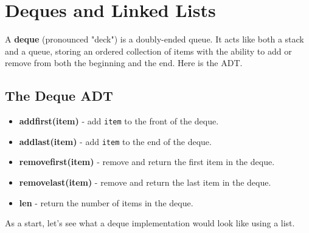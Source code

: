 \chapter{Deques and Linked Lists}


A \textbf{deque} (pronounced "deck") is a doubly-ended queue.
It acts like both a stack and a queue, storing an ordered collection of items with the ability to add or remove from both the beginning and the end.
Here is the ADT.

\section{The Deque ADT}

\begin{itemize}

\item \textbf{addfirst(item)} - add \texttt{item} to the front of the deque.

\item \textbf{addlast(item)} - add \texttt{item} to the end of the deque.

\item \textbf{removefirst(item)} - remove and return the first item in the deque.

\item \textbf{removelast(item)} - remove and return the last item in the deque.

\item \textbf{len} - return the number of items in the deque.

\end{itemize}

As a start, let's see what a deque implementation would look like using a list.

